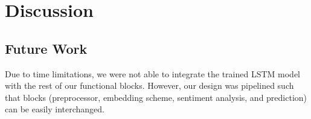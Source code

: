 \documentclass[11pt,a4paper]{article}
\begin{document}
\section{Discussion}

\subsection{Future Work}
Due to time limitations, we were not able to integrate the trained LSTM model with the rest of our functional blocks. However, our design was pipelined such that blocks (preprocessor, embedding scheme, sentiment analysis, and prediction) can be easily interchanged. 
%
%
%
%



\appendix


	
\end{document}
